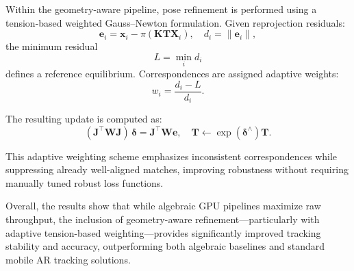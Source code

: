 Within the geometry-aware pipeline, pose refinement is performed using a tension-based weighted Gauss--Newton formulation. Given reprojection residuals:
\[
\mathbf{e}_i = \mathbf{x}_i - \pi(\mathbf{K}\mathbf{T}\mathbf{X}_i), \quad d_i = \|\mathbf{e}_i\|,
\]
the minimum residual
\[
L = \min_i d_i
\]
defines a reference equilibrium. Correspondences are assigned adaptive weights:
\[
w_i = \frac{d_i - L}{d_i}.
\]

The resulting update is computed as:
\[
(\mathbf{J}^\top \mathbf{W} \mathbf{J})\,\boldsymbol{\delta}
=
\mathbf{J}^\top \mathbf{W} \mathbf{e}, \quad
\mathbf{T} \leftarrow \exp(\boldsymbol{\delta}^\wedge)\mathbf{T}.
\]

This adaptive weighting scheme emphasizes inconsistent correspondences while suppressing already well-aligned matches, improving robustness without requiring manually tuned robust loss functions.

Overall, the results show that while algebraic GPU pipelines maximize raw throughput, the inclusion of geometry-aware refinement—particularly with adaptive tension-based weighting—provides significantly improved tracking stability and accuracy, outperforming both algebraic baselines and standard mobile AR tracking solutions.